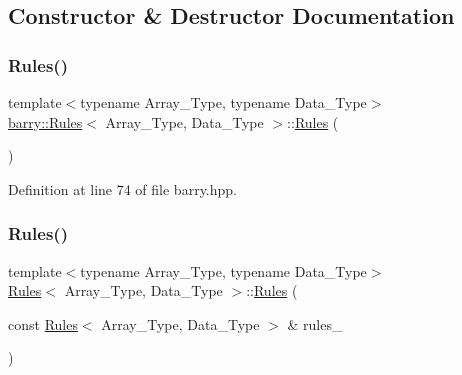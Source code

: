 \subsection{Constructor \& Destructor Documentation}
\mbox{\label{classbarry_1_1_rules_ac9468cdfab55a3be6675ad1fddae2bc0}} 
\subsubsection{\texorpdfstring{Rules()}{Rules()}\hspace{0.1cm}{\footnotesize\ttfamily [1/2]}}
{\footnotesize\ttfamily template$<$typename Array\+\_\+\+Type, typename Data\+\_\+\+Type$>$ \\
\hyperlink{classbarry_1_1_rules}{barry\+::\+Rules}$<$ Array\+\_\+\+Type, Data\+\_\+\+Type $>$\+::\hyperlink{classbarry_1_1_rules}{Rules} (\begin{DoxyParamCaption}{ }\end{DoxyParamCaption})\hspace{0.3cm}{\ttfamily [inline]}}



Definition at line 74 of file barry.\+hpp.

\mbox{\label{classbarry_1_1_rules_a57f5ab44febba391b2a06d163d25b237}} 
\subsubsection{\texorpdfstring{Rules()}{Rules()}\hspace{0.1cm}{\footnotesize\ttfamily [2/2]}}
{\footnotesize\ttfamily template$<$typename Array\+\_\+\+Type, typename Data\+\_\+\+Type$>$ \\
\hyperlink{classbarry_1_1_rules}{Rules}$<$ Array\+\_\+\+Type, Data\+\_\+\+Type $>$\+::\hyperlink{classbarry_1_1_rules}{Rules} (\begin{DoxyParamCaption}\item[{const \hyperlink{classbarry_1_1_rules}{Rules}$<$ Array\+\_\+\+Type, Data\+\_\+\+Type $>$ \&}]{rules\+\_\+ }\end{DoxyParamCaption})\hspace{0.3cm}{\ttfamily [inline]}}



